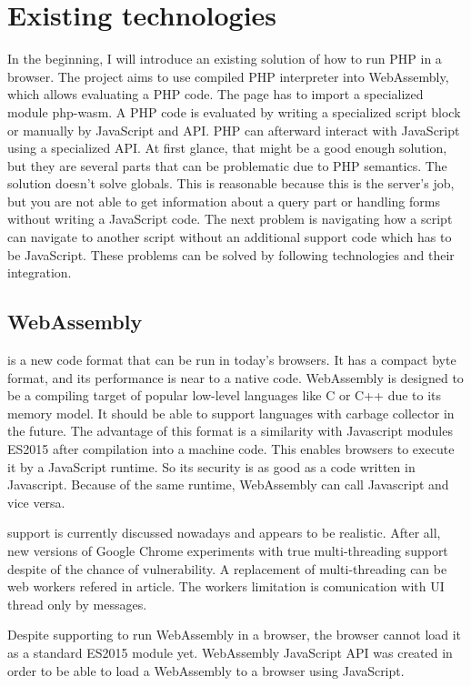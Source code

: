 \chapter{Existing technologies}

In the beginning, I will introduce an existing solution of how to run PHP in a browser. 
The project \cite{Pib} aims to use compiled PHP interpreter into WebAssembly, which allows evaluating a PHP code.
The page has to import a specialized module php-wasm. 
A PHP code is evaluated by writing a specialized script block or manually by JavaScript and API.
PHP can afterward interact with JavaScript using a specialized API.
At first glance, that might be a good enough solution, but they are several parts that can be problematic due to PHP semantics.
The solution doesn't solve globals. 
This is reasonable because this is the server's job, but you are not able to get information about a query part or handling forms without writing a JavaScript code.
The next problem is navigating how a script can navigate to another script without an additional support code which has to be JavaScript.
These problems can be solved by following technologies and their integration.

\section{WebAssembly}

\cite{WebAssembly} is a new code format that can be run in today's browsers. 
It has a compact byte format, and its performance is near to a native code. 
WebAssembly is designed to be a compiling target of popular low-level languages like C or C++ due to its memory model. 
It should be able to support languages with carbage collector in the future. 
The advantage of this format is a similarity with Javascript modules ES2015 after compilation into a machine code. 
This enables browsers to execute it by a JavaScript runtime. 
So its security is as good as a code written in Javascript. 
Because of the same runtime, WebAssembly can call Javascript and vice versa.

\cite{Threads} support is currently discussed nowadays and appears to be realistic.
After all, new versions of Google Chrome experiments with true multi-threading support despite of the chance of vulnerability.
A replacement of multi-threading can be web workers refered in \cite{WebWorkers} article.
The workers limitation is comunication with UI thread only by messages.

Despite supporting to run WebAssembly in a browser, the browser cannot load it as a standard ES2015 module yet.
WebAssembly JavaScript API was created in order to be able to load a WebAssembly to a browser using JavaScript.

